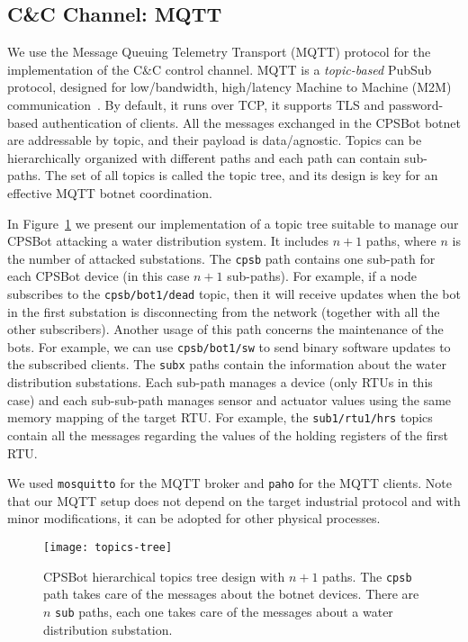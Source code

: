\documentclass[sigconf]{acmart}
\makeatletter
\newcommand{\Botnet}{CPSBot\@\xspace}
\newcommand{\bn}{cpsb\@\xspace}
\newcommand{\CC}{C\&C\@\xspace}
\makeatother
\begin{document}

\subsection{\CC Channel: MQTT}
\label{sec:dei-protocol}


We use the Message Queuing Telemetry Transport (MQTT) protocol for the
implementation of the \CC control channel. MQTT is a \emph{topic-based} PubSub
protocol, designed for low\-/bandwidth, high\-/latency Machine to Machine
(M2M) communication~\cite{mqtt}. By default, it runs over TCP, it
supports TLS and password-based authentication of clients.
All the messages exchanged in the \Botnet botnet are addressable
by topic, and their payload is data\-/agnostic. Topics can
be hierarchically organized with different paths and each path can contain
sub-paths. The set of all topics is called the topic tree, and its design is
key for an effective MQTT botnet coordination.

In Figure~\ref{fig:topics-tree} we present our implementation of a topic tree
suitable to manage our \Botnet attacking a water distribution system. It
includes $n+1$ paths, where $n$ is the number of
attacked substations. The \texttt{\bn} path contains one sub-path for each \Botnet
device (in this case $n+1$ sub-paths). For example, if a node subscribes to the
\texttt{\bn/bot1/dead} topic, then it will receive updates when the bot in
the first substation is disconnecting from the network (together with all the
other subscribers). Another usage of this path concerns the maintenance of the
bots. For example, we can use \texttt{\bn/bot1/sw} to send binary software
updates to the subscribed clients.
The \texttt{subx} paths contain the information
about the water distribution substations. Each sub-path manages a
device (only RTUs in this case) and each sub-sub-path manages sensor
and actuator values using the same
memory mapping of the target RTU. For example, the \texttt{sub1/rtu1/hrs} topics
contain all the messages regarding the values of the holding registers
of the first RTU.

We used \texttt{mosquitto} for the MQTT broker and \texttt{paho} for the MQTT
clients. Note that our MQTT setup does not depend on the target industrial
protocol and with minor modifications, it can be adopted for other physical
processes.

\begin{figure}[b]
    \centering
    \texttt{[image: topics-tree]}
    \caption{\Botnet hierarchical topics tree design with $n+1$
            paths. The \texttt{\bn} path takes care of the messages about
            the botnet devices. There are $n$ \texttt{sub} paths, each one
            takes care of the messages about a water distribution substation.}
    \label{fig:topics-tree}
\end{figure}
\end{document}
